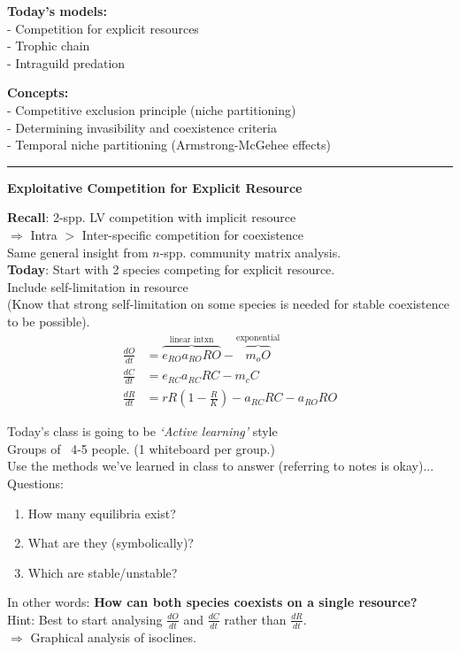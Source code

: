 \documentclass{article}
\newcommand{\note}[1]{\colorbox{gray!30}{#1}}
\newcommand{\ind}{\-\hspace{1cm}}
\begin{document}
\noindent{}

\textbf{Today's models:}\\
\ind - Competition for explicit resources\\
\ind - Trophic chain\\
\ind - Intraguild predation

\textbf{Concepts:}\\
\ind - Competitive exclusion principle (niche partitioning)\\
\ind - Determining invasibility and coexistence criteria\\
\ind - Temporal niche partitioning (Armstrong-McGehee effects)

\rule[0.5ex]{\linewidth}{1pt}
\begin{center}
	\textbf{Exploitative Competition for Explicit Resource}
\end{center}

\textbf{Recall}: 2-spp. LV competition with implicit resource\\
\ind $\Rightarrow$ Intra $>$ Inter-specific competition for coexistence\\
\ind Same general insight from $n$-spp. community matrix analysis.\\

\textbf{Today}: Start with 2 species competing for explicit resource.\\
\ind Include self-limitation in resource\\
\ind  (Know that strong self-limitation on some species is needed for stable coexistence to be possible).
\begin{align*}
	\frac{dO}{dt}&=\overbrace{e_{RO}a_{RO}R O}^{\text{linear intxn}} - \overbrace{m_o O}^{\text{exponential}}\\
	\frac{dC}{dt}&=e_{RC}a_{RC}RC - m_c C\\
	\frac{dR}{dt}&=r R \left(1-\frac{R}{K}\right) - a_{RC}RC - a_{RO}RO
\end{align*}

Today's class is going to be \emph{`Active learning'} style\\
\ind \note{Groups of ~4-5 people.  (1 whiteboard per group.)}\\

Use the methods we've learned in class to answer (\note{referring to notes is okay})...\\
\note{Questions:}
\begin{enumerate}
	\item How many equilibria exist?
	\item What are they (symbolically)?
	\item Which are stable/unstable?
\end{enumerate}
In other words: \textbf{How can both species coexists on a single resource?}\\
\ind \note{Hint:  Best to start analysing $\frac{dO}{dt}$ and $\frac{dC}{dt}$ rather than $\frac{dR}{dt}$}.\\
\ind $\Rightarrow$ Graphical analysis of isoclines.\\
\end{document}
